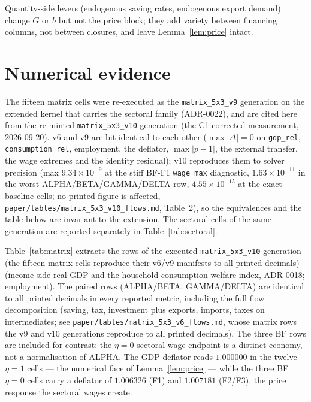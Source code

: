 \documentclass[11pt]{article}
\numberwithin{equation}{section}
\begin{document}
Quantity-side levers (endogenous saving rates, endogenous export demand)
change $G$ or $b$ but not the price block; they add variety between
financing columns, not between closures, and leave Lemma~\ref{lem:price}
intact.

\section{Numerical evidence}\label{sec:conclusion}

\textcolor{revisionV2}{The fifteen matrix cells were re-executed as the
\texttt{matrix\_5x3\_v9} generation on the extended kernel that carries the
sectoral family (ADR-0022), and are cited here from the
\textcolor{revisionV3}{re-minted \texttt{matrix\_5x3\_v10} generation (the
C1-corrected measurement, 2026-09-20). v6 and v9 are bit-identical to each
other ($\max|\Delta| = 0$ on \texttt{gdp\_rel}, \texttt{consumption\_rel},
employment, the deflator, $\max|p-1|$, the external transfer, the wage extremes
and the identity residual); v10 reproduces them to solver precision (max
$9.34\times10^{-9}$ at the stiff BF-F1 \texttt{wage\_max} diagnostic,
$1.63\times10^{-11}$ in the worst ALPHA/BETA/GAMMA/DELTA row,
$4.55\times10^{-15}$ at the exact-baseline cells; no printed figure is
affected, \texttt{paper/tables/matrix\_5x3\_v10\_flows.md}, Table~2), so the
equivalences and the table below are invariant to the extension. The sectoral
cells of the same generation are reported separately in
Table~\ref{tab:sectoral}.}}

Table~\ref{tab:matrix} extracts the rows of the executed
\texttt{matrix\_5x3\_v10} generation \textcolor{revisionV3}{(the fifteen matrix
cells reproduce their v6/v9 manifests to all printed decimals)} (income-side real GDP and the
household-consumption welfare index, ADR-0018; employment). The paired rows
(ALPHA/BETA, GAMMA/DELTA) are identical to all printed decimals in every
reported metric, including the full flow decomposition (saving, tax,
investment plus exports, imports, taxes on intermediates; see
\texttt{paper/tables/matrix\_5x3\_v6\_flows.md}, whose matrix rows the v9 and v10
generations reproduce to all printed decimals). \textcolor{revisionV1}{The
three BF rows are included for contrast: the $\eta = 0$ sectoral-wage
endpoint is a distinct economy, not a normalisation of ALPHA.} The GDP
deflator reads $1.000000$ in \textcolor{revisionV1}{the twelve $\eta = 1$
cells --- the numerical face of Lemma~\ref{lem:price} --- while the three BF
$\eta = 0$ cells carry a deflator of $1.006326$ (F1) and $1.007181$
(F2/F3), the price response the sectoral wages create.}
\end{document}
